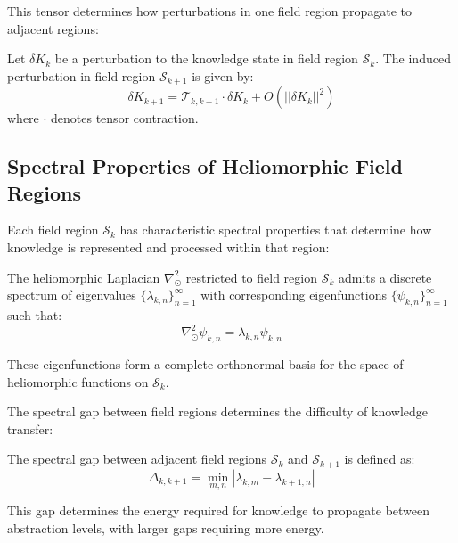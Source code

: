 \begin{definition}
\begin{theorem}
This tensor determines how perturbations in one field region propagate to adjacent regions:

\begin{theorem}
Let $\delta K_k$ be a perturbation to the knowledge state in field region $\mathcal{S}_k$. The induced perturbation in field region $\mathcal{S}_{k+1}$ is given by:
\begin{equation}
\delta K_{k+1} = \mathcal{T}_{k,k+1} \cdot \delta K_k + O(||\delta K_k||^2)
\end{equation}
where $\cdot$ denotes tensor contraction.
\end{theorem}

\subsection{Spectral Properties of Heliomorphic Field Regions}

Each field region $\mathcal{S}_k$ has characteristic spectral properties that determine how knowledge is represented and processed within that region:

\begin{theorem}
The heliomorphic Laplacian $\nabla_{\odot}^2$ restricted to field region $\mathcal{S}_k$ admits a discrete spectrum of eigenvalues $\{\lambda_{k,n}\}_{n=1}^{\infty}$ with corresponding eigenfunctions $\{\psi_{k,n}\}_{n=1}^{\infty}$ such that:
\begin{equation}
\nabla_{\odot}^2 \psi_{k,n} = \lambda_{k,n} \psi_{k,n}
\end{equation}

These eigenfunctions form a complete orthonormal basis for the space of heliomorphic functions on $\mathcal{S}_k$.
\end{theorem}

The spectral gap between field regions determines the difficulty of knowledge transfer:

\begin{proposition}
The spectral gap between adjacent field regions $\mathcal{S}_k$ and $\mathcal{S}_{k+1}$ is defined as:
\begin{equation}
\Delta_{k,k+1} = \min_{m,n} |\lambda_{k,m} - \lambda_{k+1,n}|
\end{equation}

This gap determines the energy required for knowledge to propagate between abstraction levels, with larger gaps requiring more energy.
\end{proposition}


\end{theorem}
\end{definition}
